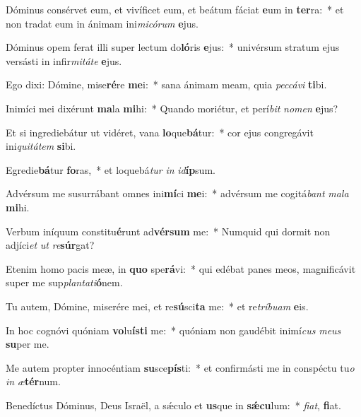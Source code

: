 \item Dóminus consérvet eum, et vivíficet eum, et beátum fáciat \textbf{e}um in \textbf{ter}ra:~* et non tradat eum in ánimam ini\textit{mi}\textit{có}\textit{rum} \textbf{e}jus.
\item Dóminus opem ferat illi super lectum do\textbf{ló}ris \textbf{e}jus:~* univérsum stratum ejus versásti in infir\textit{mi}\textit{tá}\textit{te} \textbf{e}jus.
\item Ego dixi: Dómine, mise\textbf{ré}re \textbf{me}i:~* sana ánimam meam, quia \textit{pec}\textit{cá}\textit{vi} \textbf{ti}bi.
\item Inimíci mei dixérunt \textbf{ma}la \textbf{mi}hi:~* Quando moriétur, et perí\textit{bit} \textit{no}\textit{men} \textbf{e}jus?
\item Et si ingrediebátur ut vidéret, vana \textbf{lo}que\textbf{bá}tur:~* cor ejus congregávit ini\textit{qui}\textit{tá}\textit{tem} \textbf{si}bi.
\item Egredie\textbf{bá}tur \textbf{fo}ras,~* et loquebá\textit{tur} \textit{in} \textit{id}\textbf{íp}sum.
\item Advérsum me susurrábant omnes ini\textbf{mí}ci \textbf{me}i:~* advérsum me cogitá\textit{bant} \textit{ma}\textit{la} \textbf{mi}hi.
\item Verbum iníquum constitu\textbf{é}runt ad\textbf{vér}\textbf{sum} me:~* Numquid qui dormit non adjíci\textit{et} \textit{ut} \textit{re}\textbf{súr}gat?
\item Etenim homo pacis meæ, in \textbf{quo} spe\textbf{rá}vi:~* qui edébat panes meos, magnificávit super me sup\textit{plan}\textit{ta}\textit{ti}\textbf{ó}nem.
\item Tu autem, Dómine, miserére mei, et re\textbf{sú}sci\textbf{ta} me:~* et re\textit{trí}\textit{bu}\textit{am} \textbf{e}is.
\item In hoc cognóvi quóniam \textbf{vo}lu\textbf{ís}\textbf{ti} me:~* quóniam non gaudébit inimí\textit{cus} \textit{me}\textit{us} \textbf{su}per me.
\item Me autem propter innocéntiam \textbf{su}sce\textbf{pís}ti:~* et confirmásti me in conspéctu tu\textit{o} \textit{in} \textit{æ}\textbf{tér}num.
\item Benedíctus Dóminus, Deus Israël, a sǽculo et \textbf{us}que in \textbf{sǽ}\textbf{cu}lum:~* \textit{fi}\textit{at}, \textbf{fi}at.
